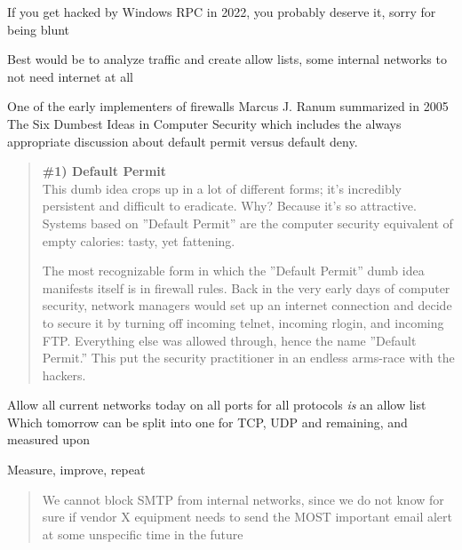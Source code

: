 \documentclass[Screen16to9,17pt]{foils}
\begin{document}
If you get hacked by Windows RPC in 2022, you probably deserve it, sorry for being blunt

Best would be to analyze traffic and create allow lists, some internal networks to not need internet at all




One of the early implementers of firewalls Marcus J. Ranum summarized in 2005 The Six Dumbest Ideas in Computer Security  which includes the always appropriate discussion about default permit versus default deny.

\begin{quote}\small {\bf
\#1) Default Permit}\\
This dumb idea crops up in a lot of different forms; it’s incredibly persistent and difficult to eradicate. Why? Because it’s so attractive. Systems based on ”Default Permit” are the computer security equivalent of empty calories: tasty, yet fattening.

The most recognizable form in which the ”Default Permit” dumb idea manifests itself is in firewall rules. Back in the very early days of computer security, network managers would set up an internet connection and decide to secure it by turning off incoming telnet, incoming rlogin, and incoming FTP. Everything else was allowed through, hence the name ”Default Permit.” This put the security practitioner in an endless arms-race with the hackers.
\end{quote}


\begin{list2}
\item Allow all current networks today on all ports for all protocols \emph{is} an allow list \\
Which tomorrow can be split into one for TCP, UDP and remaining, and measured upon
\item Measure, improve, repeat
\end{list2}




\begin{quote}
We cannot block SMTP from internal networks, since we do not know for sure if vendor X equipment needs to send the MOST important email alert at some unspecific time in the future
\end{quote}
\end{document}
